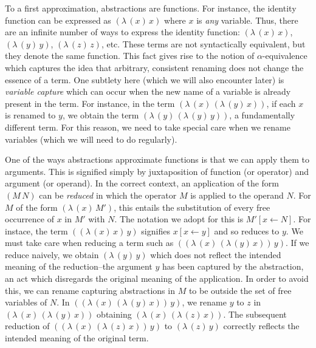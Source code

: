 \documentclass[ms,electronic,twosidetoc,letterpaper,chaptercenter,parttop]{byumsphd}
\newcommand{\abs}[2]{(\lambda\,(#1)\,#2)}
\newcommand{\app}[2]{(#1\,#2)}
\begin{document}
To a first approximation, abstractions are functions. For instance, the identity function
can be expressed as $\abs{x}{x}$ where $x$ is \emph{any} variable. Thus, there are an
infinite number of ways to express the identity function: $\abs{x}{x}$, $\abs{y}{y}$,
$\abs{z}{z}$, etc. These terms are not syntactically equivalent, but they denote the same
function. This fact gives rise to the notion of $\alpha$-equivalence which captures the
idea that arbitrary, consistent renaming does not change the essence of a term. One
subtlety here (which we will also encounter later) is \emph{variable capture} which can
occur when the new name of a variable is already present in the term. For instance, in the
term $\abs{x}{\abs{y}{x}}$, if each $x$ is renamed to $y$, we obtain the term $\abs{y}{\abs{y}{y}}$, 
a fundamentally different term. For this reason, we need to take special 
care when we rename variables (which we will need to do regularly).

One of the ways abstractions approximate functions is that we can apply them to arguments.
This is signified simply by juxtaposition of function (or operator) and argument (or
operand). In the correct context, an application of the form $\app{M}{N}$ can be \emph{reduced}
in which the operator $M$ is applied to the operand $N$. For $M$ of the form $\abs{x}{M'}$, 
this entails the substitution of every free occurrence of $x$ in $M'$ with $N$. The notation 
we adopt for this is $M'[x\leftarrow N]$. For instace, the term $\app{\abs{x}{x}}{y}$ signifies 
$x[x\leftarrow y]$ and so reduces to $y$. We must take care when reducing a term such as 
$\app{\abs{x}{\abs{y}{x}}}{y}$. If we reduce naively, we obtain $\abs{y}{y}$ which does not 
reflect the intended meaning of the reduction--the argument $y$ has been captured by the 
abstraction, an act which disregards the original meaning of the application. In order to 
avoid this, we can rename capturing abstractions in $M$ to be outside the set of free 
variables of $N$. In $\app{\abs{x}{\abs{y}{x}}}{y}$, we rename $y$ to $z$ in $\abs{x}{\abs{y}{x}}$ 
obtaining $\abs{x}{\abs{z}{x}}$. The subsequent reduction of $\app{\abs{x}{\abs{z}{x}}}{y}$ to 
$\abs{z}{y}$ correctly reflects the intended meaning of the original term.
\end{document}
